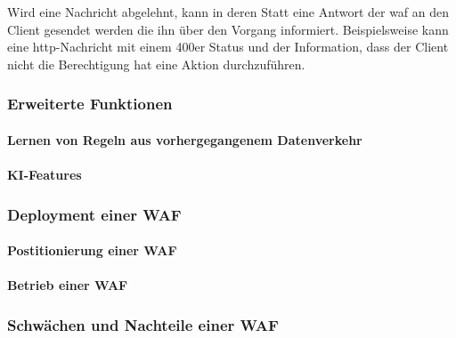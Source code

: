 Wird eine Nachricht abgelehnt, kann in deren Statt eine Antwort der \ac{waf} an den Client gesendet werden die ihn über den Vorgang informiert.
Beispielsweise kann eine \ac{http}-Nachricht mit einem 400er Status und der Information, dass der Client nicht die Berechtigung hat eine Aktion durchzuführen.

\subsubsection{Erweiterte Funktionen}
\paragraph{Lernen von Regeln aus vorhergegangenem Datenverkehr}
\paragraph{KI-Features}
\subsubsection{Deployment einer WAF}
\paragraph{Postitionierung einer WAF}
\paragraph{Betrieb einer WAF}
\subsubsection{Schwächen und Nachteile einer WAF}
